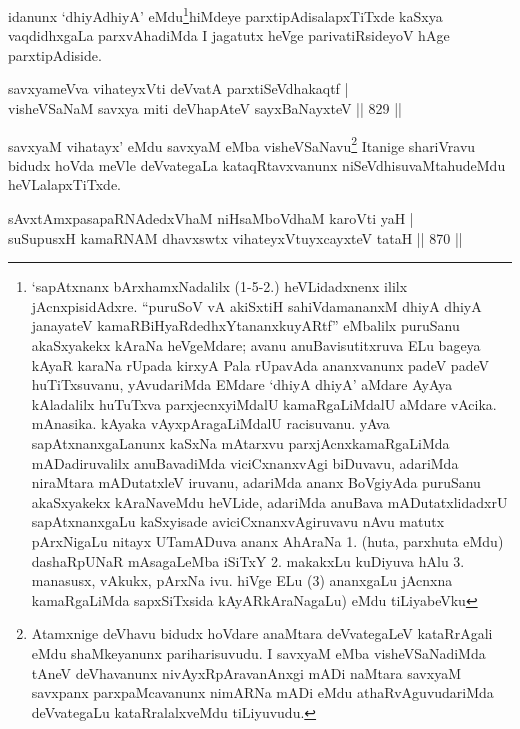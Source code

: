 \begin{artha}
idanunx `dhiyAdhiyA' eMdu\footnote{`sapAtxnanx bArxhamxNadalilx (1-5-2.) heVLidadxnenx ililx jAcnxpisidAdxre. ``puruSoV vA akiSxtiH sahiVdamananxM dhiyA dhiyA janayateV kamaRBiHyaRdedhxYtananxkuyARtf'' eMbalilx puruSanu akaSxyakekx kAraNa heVgeMdare; avanu anuBavisutitxruva ELu bageya kAyaR karaNa rUpada kirxyA Pala rUpavAda ananxvanunx padeV padeV huTiTxsuvanu, yAvudariMda EMdare `dhiyA dhiyA' aMdare AyAya kAladalilx huTuTxva parxjecnxyiMdalU kamaRgaLiMdalU aMdare vAcika. mAnasika. kAyaka vAyxpAragaLiMdalU racisuvanu. yAva sapAtxnanxgaLanunx kaSxNa mAtarxvu parxjAcnxkamaRgaLiMda mADadiruvalilx anuBavadiMda viciCxnanxvAgi biDuvavu, adariMda niraMtara mADutatxleV iruvanu, adariMda ananx BoVgiyAda puruSanu akaSxyakekx kAraNaveMdu heVLide, adariMda anuBava mADutatxlidadxrU sapAtxnanxgaLu kaSxyisade aviciCxnanxvAgiruvavu nAvu matutx pArxNigaLu nitayx UTamADuva ananx AhAraNa 1. (huta, parxhuta eMdu) dashaRpUNaR mAsagaLeMba iSiTxY 2. makakxLu kuDiyuva hAlu 3. manasusx, vAkukx, pArxNa ivu. hiVge ELu (3) ananxgaLu jAcnxna kamaRgaLiMda sapxSiTxsida kAyARkAraNagaLu) eMdu tiLiyabeVku}hiMdeye parxtipAdisalapxTiTxde kaSxya vaqdidhxgaLa parxvAhadiMda I jagatutx heVge parivatiRsideyoV hAge parxtipAdiside.
\end{artha}

\begin{shl}
savxyameVva vihateyxVti deVvatA parxtiSeVdhakaqtf |\\
visheVSaNaM savxya miti deVhapAteV \s sayxBaNayxteV \hfill|| 829 ||
\end{shl}

\begin{artha}
savxyaM vihatayx' eMdu savxyaM eMba visheVSaNavu\footnote{Atamxnige deVhavu bidudx hoVdare anaMtara deVvategaLeV kataRrAgali eMdu shaMkeyanunx pariharisuvudu. I savxyaM eMba visheVSaNadiMda tAneV deVhavanunx nivAyxRpAravanAnxgi mADi naMtara savxyaM savxpanx parxpaMcavanunx nimARNa mADi eMdu athaRvAguvudariMda deVvategaLu kataRralalxveMdu tiLiyuvudu.} Itanige shariVravu bidudx hoVda meVle deVvategaLa kataqRtavxvanunx niSeVdhisuvaMtahudeMdu heVLalapxTiTxde.
\end{artha}


\begin{shl}
sAvxtAmxpasapaRNAdedxVhaM niHsaMboVdhaM karoVti yaH | \\
suSupusxH kamaRNAM dhavxswtx vihateyxVtuyxcayxteV tataH \hfill||  870 ||  
\end{shl}

